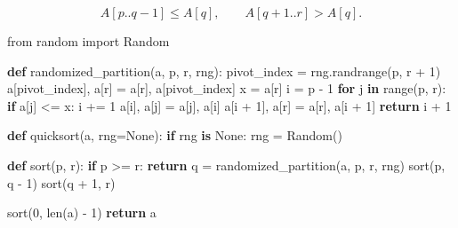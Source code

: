\documentclass[
  UTF8,fontset=none,zihao=5]{ctexart}
\newenvironment{Shaded}{}{}
\newcommand{\BuiltInTok}[1]{#1}
\newcommand{\ControlFlowTok}[1]{\textcolor[rgb]{0.00,0.44,0.13}{\textbf{#1}}}
\newcommand{\DecValTok}[1]{\textcolor[rgb]{0.25,0.63,0.44}{#1}}
\newcommand{\ImportTok}[1]{#1}
\newcommand{\KeywordTok}[1]{\textcolor[rgb]{0.00,0.44,0.13}{\textbf{#1}}}
\newcommand{\NormalTok}[1]{#1}
\newcommand{\OperatorTok}[1]{\textcolor[rgb]{0.40,0.40,0.40}{#1}}
\newcommand{\VariableTok}[1]{\textcolor[rgb]{0.10,0.09,0.49}{#1}}
\renewenvironment{Shaded}{\begin{snugshade}}{\end{snugshade}}
\begin{document}
\[
A[p..q-1]\le A[q],\qquad A[q+1..r]>A[q].
\]

\Needspace{156pt}

\begin{Shaded}
\begin{Highlighting}[]
\ImportTok{from}\NormalTok{ random }\ImportTok{import}\NormalTok{ Random}


\KeywordTok{def}\NormalTok{ randomized\_partition(a, p, r, rng):}
\NormalTok{    pivot\_index }\OperatorTok{=}\NormalTok{ rng.randrange(p, r }\OperatorTok{+} \DecValTok{1}\NormalTok{)}
\NormalTok{    a[pivot\_index], a[r] }\OperatorTok{=}\NormalTok{ a[r], a[pivot\_index]}
\NormalTok{    x }\OperatorTok{=}\NormalTok{ a[r]}
\NormalTok{    i }\OperatorTok{=}\NormalTok{ p }\OperatorTok{{-}} \DecValTok{1}
    \ControlFlowTok{for}\NormalTok{ j }\KeywordTok{in} \BuiltInTok{range}\NormalTok{(p, r):}
        \ControlFlowTok{if}\NormalTok{ a[j] }\OperatorTok{\textless{}=}\NormalTok{ x:}
\NormalTok{            i }\OperatorTok{+=} \DecValTok{1}
\NormalTok{            a[i], a[j] }\OperatorTok{=}\NormalTok{ a[j], a[i]}
\NormalTok{    a[i }\OperatorTok{+} \DecValTok{1}\NormalTok{], a[r] }\OperatorTok{=}\NormalTok{ a[r], a[i }\OperatorTok{+} \DecValTok{1}\NormalTok{]}
    \ControlFlowTok{return}\NormalTok{ i }\OperatorTok{+} \DecValTok{1}
\end{Highlighting}
\end{Shaded}

\Needspace{146pt}

\begin{Shaded}
\begin{Highlighting}[]
\KeywordTok{def}\NormalTok{ quicksort(a, rng}\OperatorTok{=}\VariableTok{None}\NormalTok{):}
    \ControlFlowTok{if}\NormalTok{ rng }\KeywordTok{is} \VariableTok{None}\NormalTok{:}
\NormalTok{        rng }\OperatorTok{=}\NormalTok{ Random()}

    \KeywordTok{def}\NormalTok{ sort(p, r):}
        \ControlFlowTok{if}\NormalTok{ p }\OperatorTok{\textgreater{}=}\NormalTok{ r:}
            \ControlFlowTok{return}
\NormalTok{        q }\OperatorTok{=}\NormalTok{ randomized\_partition(a, p, r, rng)}
\NormalTok{        sort(p, q }\OperatorTok{{-}} \DecValTok{1}\NormalTok{)}
\NormalTok{        sort(q }\OperatorTok{+} \DecValTok{1}\NormalTok{, r)}

\NormalTok{    sort(}\DecValTok{0}\NormalTok{, }\BuiltInTok{len}\NormalTok{(a) }\OperatorTok{{-}} \DecValTok{1}\NormalTok{)}
    \ControlFlowTok{return}\NormalTok{ a}
\end{Highlighting}
\end{Shaded}
\end{document}
